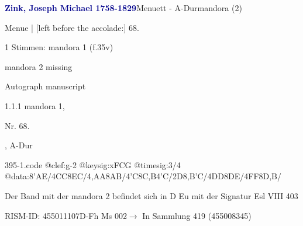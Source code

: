\documentclass[twocolumn]{book}
\begin{document}
\par \vspace{7pt} \textcolor{darkblue}{\textbf{Zink, Joseph Michael  1758-1829}}\hfillplus{\textbf{[395]}}\newline Menuett - A-Dur\newline mandora (2)
\par \begin{itshape}[f.35v, at left:] Menue | [left before the accolade:] 68.\end{itshape} 
\par \textcolor{darkblue}{}  1 Stimmen: mandora 1  (f.35v)\newline \begin{small} mandora 2 missing\end{small} \newline Autograph manuscript
\par 1.1.1  mandora 1, \begin{itshape}Nr. 68.\end{itshape}, A-Dur  
\begin{filecontents*}{395-1.code}
@clef:g-2
@keysig:xFCG
@timesig:3/4
@data:{8'AE}/4CC{8EC}/4,AA{8AB}/4'C{8C,B}4'C/2D{8,B'C}/4DD{8DE}/4FF{8D,B}/
\end{filecontents*}
\newline
%
\par Der Band mit der mandora 2 befindet sich in D Eu mit der Signatur Esl VIII 403
\par RISM-ID: 455011107\newline D-Fh  Ms 002\newline $\rightarrow$ In Sammlung 419 (455008345)
      
\end{document}

